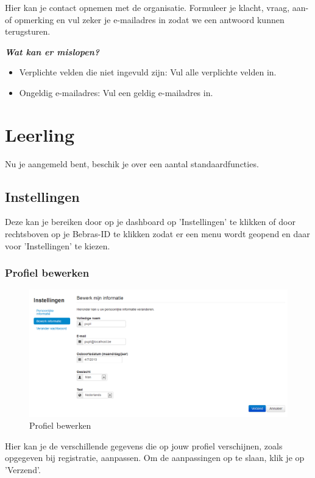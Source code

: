 \documentclass[]{article}
\begin{document}
Hier kan je contact opnemen met de organisatie. Formuleer je klacht, vraag, aan- of opmerking en vul zeker je e-mailadres in zodat we een antwoord kunnen terugsturen. 

\textbf{\textit{Wat kan er mislopen?}}

\begin{itemize}
\item Verplichte velden die niet ingevuld zijn: Vul alle verplichte velden in.
\item Ongeldig e-mailadres: Vul een geldig e-mailadres in.
\end{itemize}

\section{Leerling}

Nu je aangemeld bent, beschik je over een aantal standaardfuncties.

\subsection{Instellingen}

Deze kan je bereiken door op je dashboard op 'Instellingen' te klikken of door rechtsboven op je Bebras-ID te klikken zodat er een menu wordt geopend en daar voor 'Instellingen' te kiezen.

\subsubsection{Profiel bewerken}

\begin{figure}[!ht]
	\centering
	\includegraphics[width=1\textwidth]{img/pie}
	\caption{Profiel bewerken}
	\label{pie}
\end{figure} 
			
Hier kan je de verschillende gegevens die op jouw profiel verschijnen, zoals opgegeven bij registratie, aanpassen. Om de aanpassingen op te slaan, klik je op 'Verzend'.
\end{document}
